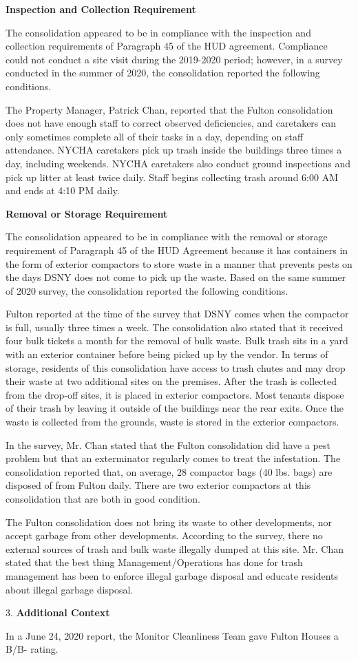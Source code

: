

\textbf{Inspection and Collection Requirement}

The consolidation appeared to be in compliance with the inspection and collection requirements of Paragraph 45 of the HUD agreement. Compliance could not conduct a site visit during the 2019-2020 period; however, in a survey conducted in the summer of 2020, the consolidation reported the following conditions.

The Property Manager, Patrick Chan, reported that the Fulton consolidation does not have enough staff to correct observed deficiencies, and caretakers can only sometimes complete all of their tasks in a day, depending on staff attendance. NYCHA caretakers pick up trash inside the buildings three times a day, including weekends. NYCHA caretakers also conduct ground inspections and pick up litter at least twice daily. Staff begins collecting trash around 6:00 AM and ends at 4:10 PM daily.

\textbf{Removal or Storage Requirement}

The consolidation appeared to be in compliance with the removal or storage requirement of Paragraph  45 of the HUD Agreement because it has containers in the form of exterior compactors to store waste in a manner that prevents pests on the days DSNY does not come to pick up the waste. Based on the same summer of  2020 survey, the consolidation reported the following conditions.

Fulton reported at the time of the survey that DSNY comes when the compactor is full, usually three times a week. The consolidation also stated that it received four bulk tickets a month for the removal of bulk waste. Bulk trash sits in a yard with an exterior container before being picked up by the vendor. In terms of storage, residents of this consolidation have access to trash chutes and may drop their waste at two additional sites on the premises. After the trash is collected from the drop-off sites, it is placed in exterior compactors. Most tenants dispose of their trash by leaving it outside of the buildings near the rear exits. Once the waste is collected from the grounds, waste is stored in the exterior compactors. 

In the survey, Mr. Chan stated that the Fulton consolidation did have a pest problem but that an exterminator regularly comes to treat the infestation. The consolidation reported that, on average, 28 compactor bags (40 lbs. bags) are disposed of from Fulton daily. There are two exterior compactors at this consolidation that are both in good condition. 

The Fulton consolidation does not bring its waste to other developments, nor accept garbage from other developments. According to the survey, there no external sources of trash and bulk waste illegally dumped at this site. Mr. Chan stated that the best thing Management/Operations has done for trash management has been to enforce illegal garbage disposal and educate residents about illegal garbage disposal. 

3. \textbf{Additional Context} 

In a June 24, 2020 report, the Monitor Cleanliness Team gave Fulton Houses a B/B- rating. 